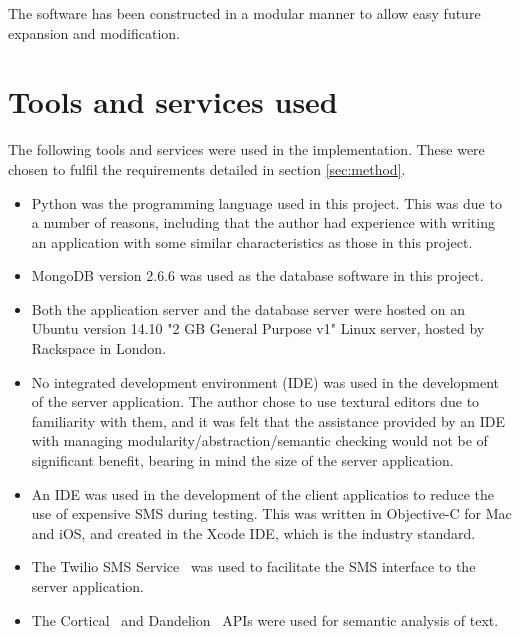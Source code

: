 \documentclass[authoryearcitations]{UoYCSproject}
\begin{document}
The software has been constructed in a modular manner to allow easy future expansion and modification.

\section{Tools and services used}
\label{sec:toolsAndServices}
The following tools and services were used in the implementation. These were chosen to fulfil the requirements detailed in section \ref{sec:method}.
\begin{itemize}
  \item Python was the programming language used in this project. This was due to a number of reasons, including that the author had experience with writing an application with some similar characteristics as those in this project.
  \item MongoDB version 2.6.6 was used as the database software in this project.
  \item Both the application server and the database server were hosted on an Ubuntu version 14.10 "2 GB General Purpose v1" Linux server, hosted by Rackspace in London.
  \item No integrated development environment (IDE) was used in the development of the server application. The author chose to use textural editors due to familiarity with them, and it was felt that the assistance provided by an IDE with managing modularity/abstraction/semantic checking would not be of significant benefit, bearing in mind the size of the server application.
  \item An IDE was used in the development of the client applicatios to reduce the use of expensive SMS during testing. This was written in Objective-C for Mac and iOS, and created in the Xcode IDE, which is the industry standard.
  \item The Twilio SMS Service~\cite{serviceTwilio} was used to facilitate the SMS interface to the server application.
  \item The Cortical~\cite{serviceCorticalSim} and Dandelion~\cite{serviceDandelionSim, serviceDandelionNex} APIs were used for semantic analysis of text.
\end{itemize}
\end{document}

